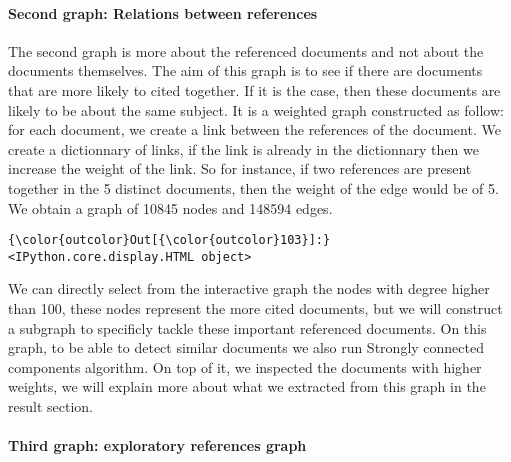 \documentclass[journal,twocolumn]{IEEEtran}
\begin{document}
    \paragraph{Second graph: Relations between
references}\label{second-graph-relations-between-references}

The second graph is more about the referenced documents and not about
the documents themselves. The aim of this graph is to see if there are
documents that are more likely to cited together. If it is the case,
then these documents are likely to be about the same subject. It is a
weighted graph constructed as follow: for each document, we create a
link between the references of the document. We create a dictionnary of
links, if the link is already in the dictionnary then we increase the
weight of the link. So for instance, if two references are present
together in the 5 distinct documents, then the weight of the edge would
be of 5. We obtain a graph of 10845 nodes and 148594 edges.



\begin{Verbatim}[commandchars=\\\{\}]
{\color{outcolor}Out[{\color{outcolor}103}]:} <IPython.core.display.HTML object>
\end{Verbatim}
            

    \begin{figure}
        \begin{center}\end{center}
        \caption{}
        \label{}
    \end{figure}
    
    We can directly select from the interactive graph the nodes with degree
higher than 100, these nodes represent the more cited documents, but we
will construct a subgraph to specificly tackle these important
referenced documents. On this graph, to be able to detect similar
documents we also run Strongly connected components algorithm. On top of
it, we inspected the documents with higher weights, we will explain more
about what we extracted from this graph in the result section.

    \paragraph{Third graph: exploratory references
graph}\label{third-graph-exploratory-references-graph}
\end{document}
